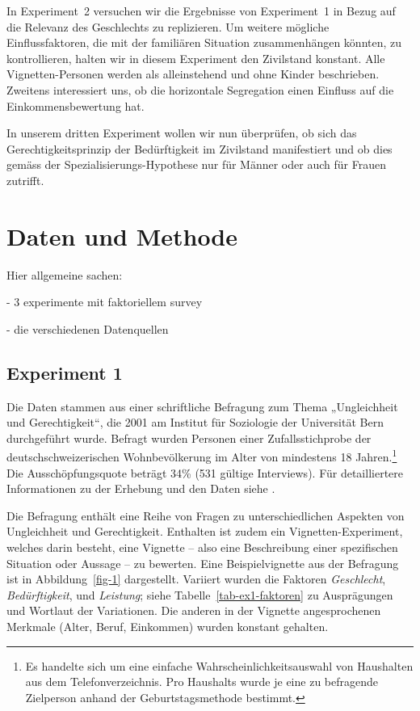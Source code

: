 \documentclass[a4paper,12pt]{article}
\begin{document}
In Experiment~2 versuchen wir die Ergebnisse von Experiment~1 in Bezug auf die
Relevanz des Geschlechts zu replizieren. Um weitere mögliche Einflussfaktoren,
die mit der familiären Situation zusammenhängen könnten, zu kontrollieren,
halten wir in diesem Experiment den Zivilstand konstant. Alle
Vignetten-Personen werden als alleinstehend und ohne Kinder beschrieben.
Zweitens interessiert uns, ob die horizontale Segregation einen Einfluss auf
die Einkommensbewertung hat.

In unserem dritten Experiment wollen wir nun überprüfen, ob sich das
Gerechtigkeitsprinzip der Bedürftigkeit im Zivilstand manifestiert und ob dies
gemäss der Spezialisierungs-Hypothese nur für Männer oder auch für Frauen
zutrifft.

\section{Daten und Methode}
\label{sec:s3}

Hier allgemeine sachen: 

- 3 experimente mit faktoriellem survey

- die verschiedenen Datenquellen

\subsection{Experiment 1}
Die Daten stammen aus einer schriftliche Befragung zum Thema „Ungleichheit und
Gerechtigkeit“, die 2001 am Institut für Soziologie der Universität Bern
durchgeführt wurde. Befragt wurden Personen einer Zufallsstichprobe der
deutschschweizerischen Wohnbevölkerung im Alter von mindestens 18
Jahren.\footnote{Es handelte sich um eine einfache Wahrscheinlichkeitsauswahl
von Haushalten aus dem Telefonverzeichnis. Pro Haushalts wurde je eine zu
befragende Zielperson anhand der Geburtstagsmethode bestimmt.} Die
Ausschöpfungsquote beträgt 34\% (531 gültige Interviews). Für detailliertere
Informationen zu der Erhebung und den Daten siehe \citet{Jann-2001}.

Die Befragung enthält eine Reihe von Fragen zu unterschiedlichen Aspekten von
Ungleichheit und Gerechtigkeit. Enthalten ist zudem ein Vignetten-Experiment,
welches darin besteht, eine Vignette -- also eine Beschreibung einer
spezifischen Situation oder Aussage -- zu bewerten. Eine Beispielvignette aus
der Befragung ist in Abbildung~\ref{fig-1} dargestellt. Variiert wurden die
Faktoren \emph{Geschlecht}, \emph{Bedürftigkeit}, und \emph{Leistung}; siehe 
Tabelle~\ref{tab-ex1-faktoren} zu Ausprägungen und Wortlaut der Variationen.
Die anderen in der Vignette angesprochenen Merkmale (Alter, Beruf, Einkommen)
wurden konstant gehalten.
\end{document}
